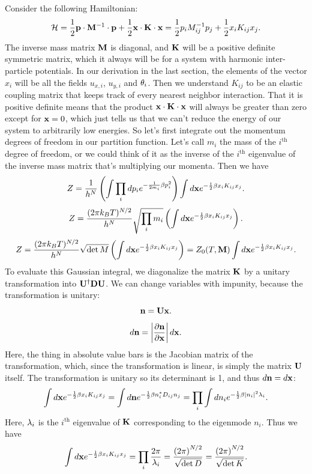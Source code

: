 \documentclass[12pt]{article}
\begin{document}
Consider the following Hamiltonian:
\[\mathcal{H} = \frac{1}{2} \mathbf{p} \cdot \mathbf{M}^{-1} \cdot \mathbf{p} + \frac{1}{2} \mathbf{x} \cdot \mathbf{K} \cdot \mathbf{x} = \frac{1}{2}p_i M^{-1}_{ij} p_j + \frac{1}{2}x_i K_{ij}x_j.\]
The inverse mass matrix $\mathbf{M}$ is diagonal, and $\mathbf{K}$ will be a positive definite symmetric matrix, which it always will be for a system with harmonic inter-particle potentials. In our derivation in the last section, the elements of the vector $x_i$ will be all the fields $u_{x,i}$, $u_{y,i}$ and $\theta_i$. Then we understand $K_{ij}$ to be an elastic coupling matrix that keeps track of every nearest neighbor interaction. That it is positive definite means that the product $\mathbf{x} \cdot \mathbf{K} \cdot \mathbf{x}$ will always be greater than zero except for $\mathbf{x} = 0$, which just tells us that we can't reduce the energy of our system to arbitrarily low energies. So let's first integrate out the momentum degrees of freedom in our partition function. Let's call $m_i$ the mass of the $i^\mathrm{th}$ degree of freedom, or we could think of it as the inverse of the $i^\mathrm{th}$ eigenvalue of the inverse mass matrix that's multiplying our momenta. Then we have
\[ Z = \frac{1}{h^N} \left(\int \prod_idp_i e^{-\frac{1}{2m_i}\beta p_i^2}\right)\int d\mathbf{x} e^{-\frac{1}{2}\beta x_iK_{ij}x_j}.\]
\[ Z = \frac{(2\pi k_BT)^{N/2}}{h^N}\sqrt{\prod_i m_i} \left(\int d\mathbf{x} e^{-\frac{1}{2}\beta x_iK_{ij}x_j}\right).\]
\[ Z = \frac{(2\pi k_BT)^{N/2}}{h^N}\sqrt{\det M} \left(\int d\mathbf{x} e^{-\frac{1}{2}\beta x_iK_{ij}x_j}\right) = Z_0(T,\mathbf{M}) \int d\mathbf{x} e^{-\frac{1}{2}\beta x_iK_{ij}x_j}.\]
To evaluate this Gaussian integral, we diagonalize the matrix $\mathbf{K}$ by a unitary transformation into $\mathbf{U}^\dagger \mathbf{D} \mathbf{U}$. We can change variables with impunity, because the transformation is unitary:
\[ \mathbf{n} = \mathbf{U} \mathbf{x}.\]
\[ d\mathbf{n} = \left | \frac{\partial {\mathbf{n}}}{\partial {\mathbf{x}}} \right | d\mathbf{x}.\]
Here, the thing in absolute value bars is the Jacobian matrix of the transformation, which, since the transformation is linear, is simply the matrix $\mathbf{U}$ itself. The transformation is unitary so its determinant is 1, and thus $d\mathbf{n} = d\mathbf{x}$:
\[ \int d\mathbf{x} e^{-\frac{1}{2}\beta x_i K_{ij} x_j} = \int d\mathbf{n} e^{-\frac{1}{2}\beta n_i^* D_{ij} n_j} = \prod_i \int dn_i e^{-\frac{1}{2} \beta \left | n_i \right |^2 \lambda_i}.\]
Here, $\lambda_i$ is the $i^\mathrm{th}$ eigenvalue of $\mathbf{K}$ corresponding to the eigenmode $n_i$. Thus we have
\[ \int d\mathbf{x} e^{-\frac{1}{2}\beta x_i K_{ij} x_j} = \prod_i \frac{2\pi}{\lambda_i} = \frac{\left(2\pi\right)^{N/2}}{\sqrt{\det D}} = \frac{\left(2\pi\right)^{N/2}}{\sqrt{\det K}}.\]
\end{document}
